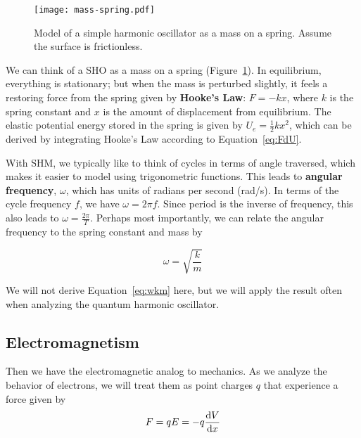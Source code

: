 \begin{figure}[!h]
	\centering
	\texttt{[image: mass-spring.pdf]}
	\caption{Model of a simple harmonic oscillator as a mass on a spring.
	Assume the surface is frictionless.}
	\label{fig:SHO-model}
\end{figure} 

We can think of a SHO as a mass on a spring (Figure~\ref{fig:SHO-model}). In equilibrium, everything is stationary; but when the mass is perturbed slightly, it feels a restoring force from the spring given by \textbf{Hooke's Law}: $F=-kx$, where $k$ is the spring constant and $x$ is the amount of displacement from equilibrium. The elastic potential energy stored in the spring is given by $U_e=\frac{1}{2}kx^2$, which can be derived by integrating Hooke's Law according to Equation~\ref{eq:FdU}. \par 

With SHM, we typically like to think of cycles in terms of angle traversed, which makes it easier to model using trigonometric functions. This leads to \textbf{angular frequency}, $\omega$, which has units of radians per second (rad/s). In terms of the cycle frequency $f$, we have $\omega = 2\pi f$. Since period is the inverse of frequency, this also leads to $\omega = \frac{2\pi}{T}$. Perhaps most importantly, we can relate the angular frequency to the spring constant and mass by 
\begin{tcolorbox}[title=Key Relationship] \vspace*{-2ex}
\begin{equation}
\omega=\sqrt{\frac{k}{m}} \label{eq:wkm}
\end{equation}
\end{tcolorbox}

We will not derive Equation~\ref{eq:wkm} here, but we will apply the result often when analyzing the quantum harmonic oscillator.


\subsection{Electromagnetism}
Then we have the electromagnetic analog to mechanics. As we analyze the behavior of electrons, we will treat them as point charges $q$ that experience a force given by 
\begin{equation*}
	F = qE = -q\dv{V}{x}
\end{equation*}


